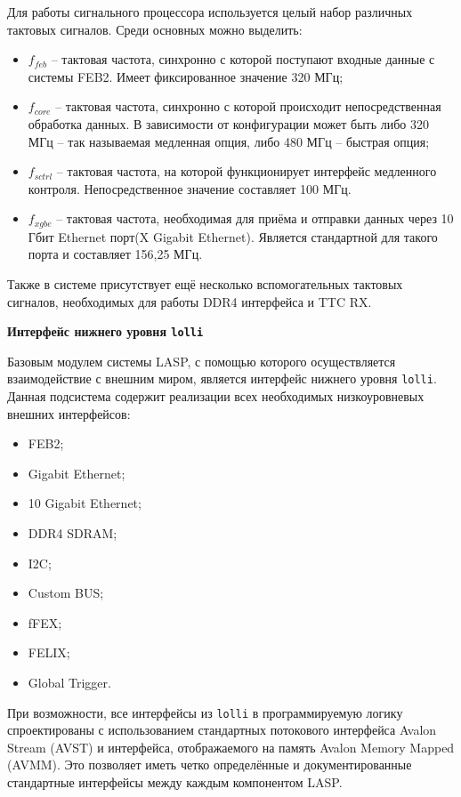 Для работы сигнального процессора используется целый набор различных тактовых сигналов. Среди основных можно выделить:
\begin{itemize}
    \item $f_{feb}$ -- тактовая частота, синхронно с которой поступают входные данные с системы FEB2. Имеет фиксированное значение 320 МГц;
    \item $f_{core}$ --  тактовая частота, синхронно с которой происходит непосредственная обработка данных. В зависимости от конфигурации может быть либо 320 МГц -- так называемая медленная опция, либо 480 МГц -- быстрая опция;
    \item $f_{sctrl}$ -- тактовая частота, на которой функционирует интерфейс медленного контроля. Непосредственное значение составляет 100 МГц.
    \item $f_{xgbe}$ -- тактовая частота, необходимая для приёма и отправки данных через 10 Гбит Ethernet порт(X Gigabit Ethernet). Является стандартной для такого порта и составляет 156,25 МГц.
\end{itemize}\par
Также в системе присутствует ещё несколько вспомогательных тактовых сигналов, необходимых для работы DDR4 интерфейса и TTC RX.\par
\textbf{Интерфейс нижнего уровня \texttt{lolli}}\par
Базовым модулем системы LASP, с помощью которого осуществляется взаимодействие с внешним миром, является интерфейс нижнего уровня \texttt{lolli}. Данная подсистема содержит реализации всех необходимых низкоуровневых внешних интерфейсов:\par
\begin{itemize}
    \item FEB2;
    \item Gigabit Ethernet;
    \item 10 Gigabit Ethernet;
    \item DDR4 SDRAM;
    \item I2C;
    \item Custom BUS;
    \item fFEX;
    \item FELIX;
    \item Global Trigger.
\end{itemize}\par
При возможности, все интерфейсы из \texttt{lolli} в программируемую логику спроектированы с использованием стандартных потокового интерфейса Avalon Stream (AVST) и интерфейса, отображаемого на память Avalon Memory Mapped (AVMM). Это позволяет иметь четко определённые и документированные стандартные интерфейсы между каждым компонентом LASP.\par
